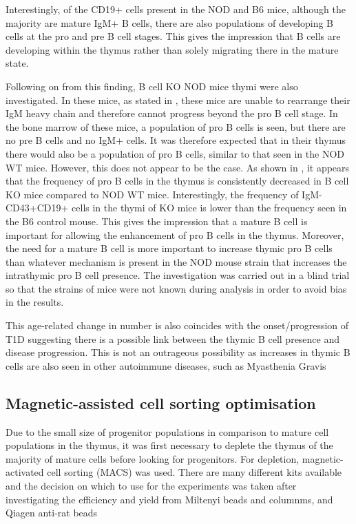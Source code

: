 Interestingly, of the CD19+ cells present in the NOD and B6 mice, although the majority are mature IgM+ B cells, there are also populations of developing B cells at the pro and pre B cell stages.
This gives the impression that B cells are developing within the thymus rather than solely migrating there in the mature state.

Following on from this finding, B cell KO NOD mice thymi were also investigated.
In these mice, as stated in , these mice are unable to rearrange their IgM heavy chain and therefore cannot progress beyond the pro B cell stage. 
In the bone marrow of these mice, a population of pro B cells is seen, but there are no pre B cells and no IgM+ cells.
It was therefore expected that in their thymus there would also be a population of pro B cells, similar to that seen in the NOD WT mice. 
However, this does not appear to be the case.
As shown in , it appears that the frequency of pro B cells in the thymus is consistently decreased in B cell KO mice compared to NOD WT mice.
Interestingly, the frequency of IgM-CD43+CD19+ cells in the thymi of KO mice is lower than the frequency seen in the B6 control mouse. 
This gives the impression that a mature B cell is important for allowing the enhancement of pro B cells in the thymus.
Moreover, the need for a mature B cell is more important to increase thymic pro B cells than whatever mechanism is present in the NOD mouse strain that increases the intrathymic pro B cell presence.
The investigation was carried out in a blind trial so that the strains of mice were not known during analysis in order to avoid bias in the results.

This age-related change in number is also coincides with the onset/progression of T1D suggesting there is a possible link between the thymic B cell presence and disease progression.
This is not an outrageous possibility as increases in thymic B cells are also seen in other autoimmune diseases, such as Myasthenia Gravis %


\subsection{Magnetic-assisted cell sorting optimisation}

Due to the small size of progenitor populations in comparison to mature cell populations in the thymus, it was first necessary to deplete the thymus of the majority of mature cells before looking for progenitors.
For depletion, magnetic-activated cell sorting (MACS) was used.
There are many different kits available and the decision on which to use for the experiments was taken after investigating the efficiency and yield from Miltenyi beads and columnms, and Qiagen anti-rat beads 

